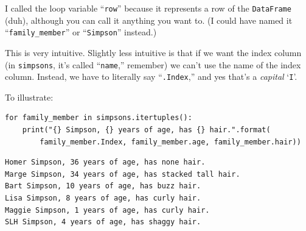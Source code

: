 I called the loop variable ``\texttt{row}'' because it represents a row of the
\texttt{DataFrame} (duh), although you can call it anything you want to. (I
could have named it ``\texttt{family\_member}'' or ``\texttt{Simpson}''
instead.)


This is very intuitive. Slightly less intuitive is that if we want the index
column (in \texttt{simpsons}, it's called ``\texttt{name},'' remember) we can't
use the name of the index column. Instead, we have to literally say
``\texttt{.Index},'' and yes that's a \textit{capital} `\texttt{I}'.

To illustrate:

\begin{Verbatim}[fontsize=\CBCodeSmall,samepage=true,frame=single,framesep=3mm]
for family_member in simpsons.itertuples():
    print("{} Simpson, {} years of age, has {} hair.".format(
        family_member.Index, family_member.age, family_member.hair))
\end{Verbatim}
\vspace{-.2in}

\begin{Verbatim}[fontsize=\small,samepage=true,frame=leftline,framesep=5mm,framerule=1mm]
Homer Simpson, 36 years of age, has none hair.
Marge Simpson, 34 years of age, has stacked tall hair.
Bart Simpson, 10 years of age, has buzz hair.
Lisa Simpson, 8 years of age, has curly hair.
Maggie Simpson, 1 years of age, has curly hair.
SLH Simpson, 4 years of age, has shaggy hair.
\end{Verbatim}

